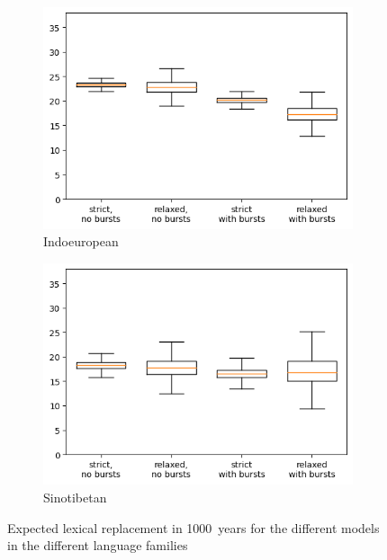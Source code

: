 \documentclass[a4paper,12pt]{scrartcl}
\begin{document}
\begin{figure}
\begin{subfigure}{0.4\textwidth}
    \includegraphics[width=\textwidth]{supplement/analysis/indoeuropean_replacement.png}
    \caption{Indoeuropean}
  \end{subfigure}
  \begin{subfigure}{0.4\textwidth}
    \includegraphics[width=\textwidth]{supplement/analysis/sinotibetan_replacement.png}
    \caption{Sinotibetan}
  \end{subfigure}
  \caption{Expected lexical replacement in 1000~years for the different models
    in the different language families}
    \label{f:clock}
\end{figure}
\end{document}
